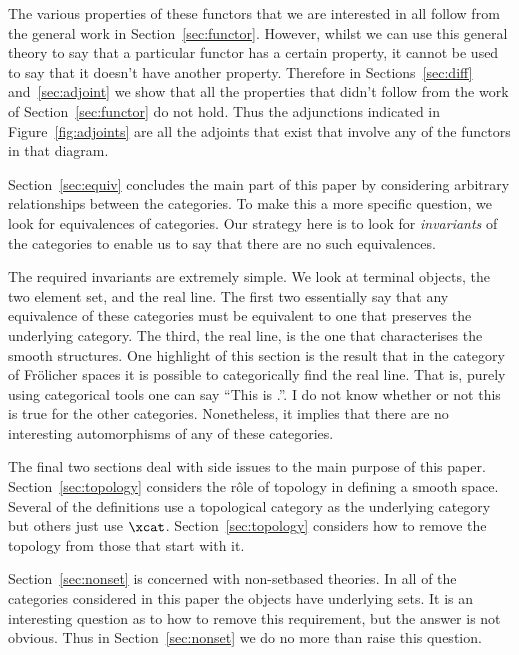\documentclass[%
12pt,%
arxiv,%
defaults
]{myclass}
\begin{document}
The various properties of these functors that we are interested in all follow from the general work in Section~\ref{sec:functor}.
However, whilst we can use this general theory to say that a particular functor has a certain property, it cannot be used to say that it doesn't have another property.
Therefore in Sections~\ref{sec:diff} and~\ref{sec:adjoint} we show that all the properties that didn't follow from the work of Section~\ref{sec:functor} do not hold.
Thus the adjunctions indicated in Figure~\ref{fig:adjoints} are all the adjoints that exist that involve any of the functors in that diagram.

\medskip

Section~\ref{sec:equiv} concludes the main part of this paper by considering arbitrary relationships between the categories.
To make this a more specific question, we look for equivalences of categories.
Our strategy here is to look for \emph{invariants} of the categories to enable us to say that there are no such equivalences.

The required invariants are extremely simple.
We look at terminal objects, the two element set, and the real line.
The first two essentially say that any equivalence of these categories must be equivalent to one that preserves the underlying category.
The third, the real line, is the one that characterises the smooth structures.
One highlight of this section is the result that in the category of Fr\"olicher spaces it is possible to categorically find the real line.
That is, purely using categorical tools one can say ``This is \R.''.
I do not know whether or not this is true for the other categories.
Nonetheless, it implies that there are no interesting automorphisms of any of these categories.

\medskip

The final two sections deal with side issues to the main purpose of this paper.
Section~\ref{sec:topology} considers the r\^ole of topology in defining a smooth space.
Several of the definitions use a topological category as the underlying category but others just use \(\xcat\).
Section~\ref{sec:topology} considers how to remove the topology from those that start with it.

Section~\ref{sec:nonset} is concerned with non\hyp{}set\enhyp{}based theories.
In all of the categories considered in this paper the objects have underlying sets.
It is an interesting question as to how to remove this requirement, but the answer is not obvious.
Thus in Section~\ref{sec:nonset} we do no more than raise this question.
\end{document}
